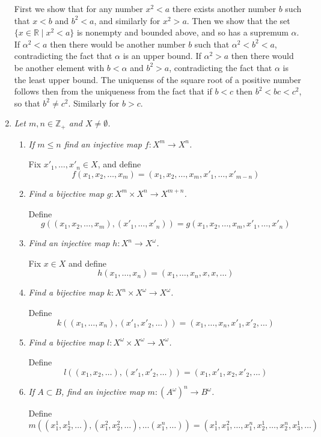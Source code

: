 \documentclass[letterpaper, 11pt]{article}
\newcommand{\Z}{\mathbb{Z}}
\newcommand{\R}{\mathbb{R}}
\begin{document}
\begin{enumerate}
First we show that for any number $x^2 < a$ there exists another number $b$ such that $x<b$ and $b^2 < a$, and similarly for $x^2 > a$.  Then we show that the set $\{x \in \R \mid x^2 < a\}$ is nonempty and bounded above, and so has a supremum $\alpha$.  If $\alpha^2 < a$ then there would be another number $b$ such that $\alpha^2 < b^2 < a$, contradicting the fact that $\alpha$ is an upper bound.  If $\alpha^2 > a$ then there would be another element with $b < \alpha$ and $b^2 > a$, contradicting the fact that $\alpha$ is the least upper bound.  The uniquenss of the square root of a positive number follows then from the uniqueness from the fact that if $b<c$ then $b^2 < bc < c^2$, so that $b^2 \neq c^2$.  Similarly for $b > c$.

\item \emph{Let $m,n \in \Z_+$ and $X \neq \emptyset$.}
\begin{enumerate}
\item \emph{If $m \leq n$ find an injective map $f: X^m \rightarrow X^n$.}

Fix $x'_1, \ldots, x'_n \in X$, and define $$f(x_1,x_2,\ldots,x_m) = (x_1, x_2, \ldots, x_m, x'_1, \ldots, x'_{m-n})$$

\item \emph{Find a bijective map $g: X^m \times X^n \rightarrow X^{m+n}$.}

Define $$g((x_1, x_2, \ldots, x_m),(x'_1, \ldots, x'_n)) = g(x_1, x_2, \ldots, x_m, x'_1, \ldots, x'_n)$$
\item \emph{Find an injective map $h: X^n \rightarrow X^\omega$.}

Fix $x \in X$ and define $$h(x_1, \ldots, x_n) = (x_1, \ldots, x_n, x, x, \ldots)$$

\item \emph{Find a bijective map $k: X^n \times X^\omega \rightarrow X^\omega$.}

Define $$k((x_1, \ldots, x_n), (x'_1, x'_2,\ldots)) = (x_1, \ldots, x_n, x'_1, x'_2, \ldots)$$

\item \emph{Find a bijective map $l: X^\omega \times X^\omega \rightarrow X^\omega$.}

Define $$l((x_1, x_2, \ldots), (x'_1, x'_2,\ldots)) = (x_1, x'_1, x_2, x'_2, \ldots)$$

\item \emph{If $A \subset B$, find an injective map $m:(A^\omega)^n \rightarrow B^\omega$.}

Define $$m\left((x_1^1,x_2^1, \ldots), (x_1^2,x_2^2,\ldots),\ldots(x_1^n,\ldots)\right) = (x_1^1, x_1^2, \ldots, x_1^n, x_2^1, \ldots, x_2^n, x_3^1, \ldots)$$
\end{enumerate}

\end{enumerate}
\end{document}
